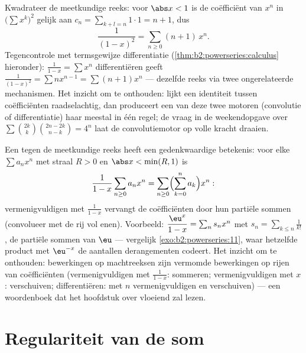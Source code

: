 \begin{example}\label{ex:b2:powerseries:cauchysquare}
Kwadrateer de meetkundige reeks: voor $\abs x < 1$ is de
coëfficiënt van $x^n$ in $\bigl(\sum x^k\bigr)^2$ gelijk aan $c_n =
\sum_{k+l=n} 1\cdot1 = n + 1$, dus
\[
\frac{1}{(1-x)^2} = \sum_{n\geq0}(n+1)\,x^n .
\]
Tegencontrole met termsgewijze differentiatie
(\cref{thm:b2:powerseries:calculus} hieronder): $\frac{1}{1-x} =
\sum x^n$ differentiëren geeft $\frac{1}{(1-x)^2} = \sum nx^{n-1} =
\sum(n+1)x^n$ --- dezelfde reeks via twee ongerelateerde
mechanismen. Het inzicht om te onthouden: lijkt een identiteit
tussen coëfficiënten raadselachtig, dan produceert een van deze
twee motoren (convolutie of differentiatie) haar meestal in één
regel; de vraag in de weekendopgave over
$\sum\binom{2k}k\binom{2n-2k}{n-k} = 4^n$ laat de convolutiemotor
op volle kracht draaien.
\end{example}

\begin{example}\label{ex:b2:powerseries:partialsums}
Een  tegen de meetkundige reeks heeft een
gedenkwaardige betekenis: voor elke $\sum a_nx^n$ met straal $R >
0$ en $\abs x < \min(R, 1)$ is
\[
\frac{1}{1-x}\sum_{n\geq0}a_nx^n
= \sum_{n\geq0}\Bigl(\sum_{k=0}^{n}a_k\Bigr)x^n :
\]
vermenigvuldigen met $\frac{1}{1-x}$ vervangt de coëfficiënten
door hun partiële sommen (convolueer met de rij vol enen).
Voorbeeld: $\dfrac{\eu^x}{1-x} = \sum_n s_n x^n$ met $s_n =
\sum_{k\leq n}\frac{1}{k!}$, de partiële sommen van $\eu$ ---
vergelijk \cref{exo:b2:powerseries:11}, waar hetzelfde product met
$\eu^{-x}$ de aantallen derangementen codeert. Het inzicht om te
onthouden: bewerkingen op machtreeksen zijn vermomde bewerkingen op
rijen van coëfficiënten (vermenigvuldigen met $\frac1{1-x}$:
sommeren; vermenigvuldigen met $x$: verschuiven; differentiëren:
met $n$ vermenigvuldigen en verschuiven) --- een woordenboek dat
het hoofdstuk over  vloeiend zal lezen.
\end{example}

\section{Regulariteit van de som}

